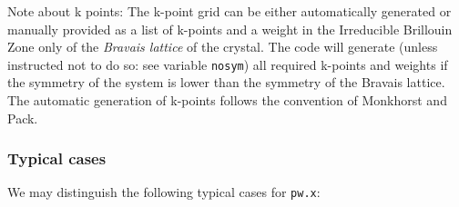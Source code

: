 \documentclass[12pt,a4paper]{article}
\begin{document}
Note about k points:
The k-point grid can be either automatically generated or manually
provided as a list of k-points and a weight in the Irreducible
Brillouin Zone only of the \emph{Bravais lattice} of the crystal.
The code will generate (unless instructed not to do so: see variable
\texttt{nosym}) all required k-points and weights if the symmetry of
the system is lower than the symmetry of the Bravais lattice.
The automatic generation of k-points follows the convention of
Monkhorst and Pack.

\subsubsection{Typical cases}

We may distinguish the following typical cases for \texttt{pw.x}:
\end{document}
